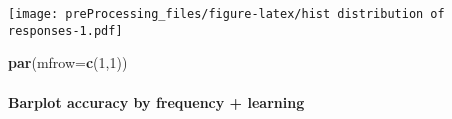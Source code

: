 \documentclass[
]{article}
\newenvironment{Shaded}{\begin{snugshade}}{\end{snugshade}}
\newcommand{\DataTypeTok}[1]{\textcolor[rgb]{0.13,0.29,0.53}{#1}}
\newcommand{\DecValTok}[1]{\textcolor[rgb]{0.00,0.00,0.81}{#1}}
\newcommand{\KeywordTok}[1]{\textcolor[rgb]{0.13,0.29,0.53}{\textbf{#1}}}
\newcommand{\NormalTok}[1]{#1}
\begin{document}
\texttt{[image: preProcessing\_files/figure-latex/hist distribution of responses-1.pdf]}

\begin{Shaded}
\begin{Highlighting}[]
\KeywordTok{par}\NormalTok{(}\DataTypeTok{mfrow=}\KeywordTok{c}\NormalTok{(}\DecValTok{1}\NormalTok{,}\DecValTok{1}\NormalTok{))}
\end{Highlighting}
\end{Shaded}

\hypertarget{barplot-accuracy-by-frequency-learning-1}{%
\paragraph{Barplot accuracy by frequency +
learning}\label{barplot-accuracy-by-frequency-learning-1}}
\end{document}
